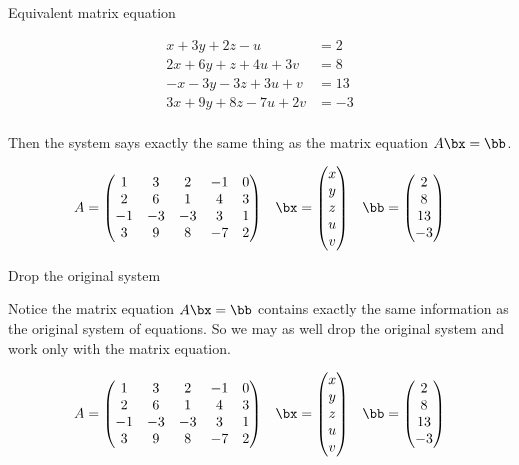 \documentclass{beamer}
\begin{document}
\begin{frame}{Equivalent matrix equation}

\begin{align*}
 x + 3y + 2z - u  \qquad &= 2 \\
2x + 6y + z + 4u + 3v  &= 8 \\
-x -3y  -3z + 3u + v  &= 13 \\
3x + 9y + 8z  -7u + 2v  &= -3 \\
\end{align*}

Then the system says exactly the same thing as the matrix equation $A \bx = \bb$.

$$
\begin{matrix}
A =
\begin{pmatrix}
1 & 3 & 2 & -1 & 0 \\
2 & 6 & 1 & 4 & 3\\
-1 & -3 & -3 & 3 & 1 \\
3 & 9 & 8 & -7 & 2
\end{pmatrix}
&
\bx =
\begin{pmatrix}
x \\ y \\ z \\ u \\ v
\end{pmatrix}
&
\bb =
\begin{pmatrix}
2 \\ 8 \\ 13 \\ -3
\end{pmatrix}
\end{matrix}
$$

\end{frame}

\begin{frame}{Drop the original system}

Notice the matrix equation $A \bx = \bb$ contains exactly the same information
as the original system of equations. So we may as well drop the original
system and work only with the matrix equation.

$$
\begin{matrix}
A =
\begin{pmatrix}
1 & 3 & 2 & -1 & 0 \\
2 & 6 & 1 & 4 & 3\\
-1 & -3 & -3 & 3 & 1 \\
3 & 9 & 8 & -7 & 2
\end{pmatrix}
&
\bx =
\begin{pmatrix}
x \\ y \\ z \\ u \\ v
\end{pmatrix}
&
\bb =
\begin{pmatrix}
2 \\ 8 \\ 13 \\ -3
\end{pmatrix}
\end{matrix}
$$

\end{frame}
\end{document}
